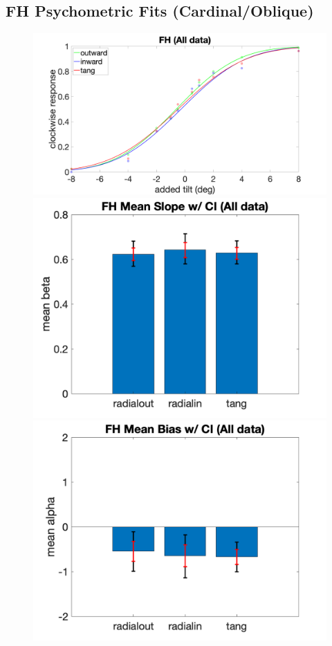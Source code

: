 \documentclass[11pt]{article} %
\begin{document}
\newpage
\subsection{FH Psychometric Fits (Cardinal/Oblique)}
\begin{figure}[H]
\centering %
\includegraphics[scale=.06]{Images/PF_FH_allcond.png}
\includegraphics[scale=.11]{Images/MeanSlopeError_ci_FH_allcond.png}
\includegraphics[scale=.11]{Images/MeanBiasError_ci_FH_allcond.png}

\end{figure}
\end{document}
